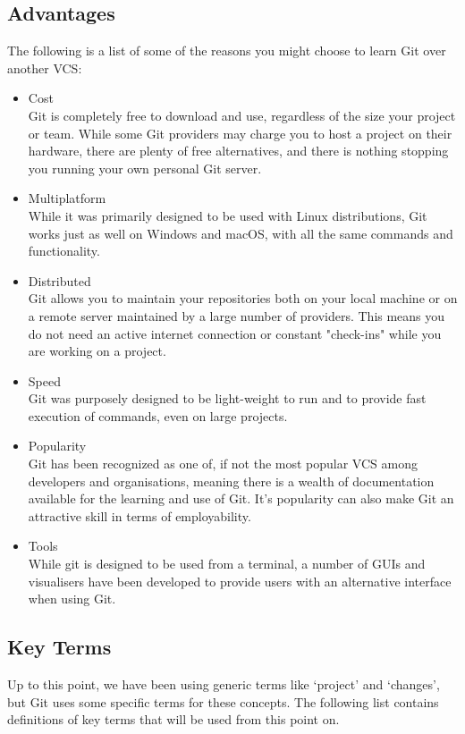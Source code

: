 \documentclass[11pt, a4paper, titlepage]{article}
\begin{document}
\subsection{Advantages}
The following is a list of some of the reasons you might choose to learn Git
over another VCS:
\begin{itemize} 
\item Cost \\
Git is completely free to download and use, regardless of the size your
project or team.  
While some Git providers may charge you to host a project on
their hardware, there are plenty of free alternatives, and there is nothing
stopping you running your own personal Git server.  
\item Multiplatform \\ 
While it was primarily designed to be used with Linux distributions, Git works
just as well on Windows and macOS, with all the same commands and functionality.
\item Distributed \\ 
Git allows you to maintain your repositories both on your local machine or on
a remote server maintained by a large number of providers. 
This means you do not need an active internet connection or constant
"check-ins" while you are working on a project.
\item Speed \\
Git was purposely designed to be light-weight to run and to provide fast
execution of commands, even on large projects.
\item Popularity \\ 
Git has been recognized as one of, if not the most popular VCS among
developers and organisations, meaning there is a wealth of documentation
available for the learning and use of Git. 
It's popularity can also make Git an attractive skill in terms of
employability.
\item Tools \\
While git is designed to be used from a terminal, a number of GUIs and
visualisers have been developed to provide users with an alternative interface
when using Git.
\end{itemize}

\subsection{Key Terms} 
Up to this point, we have been using generic terms like `project' and
`changes', but Git uses some specific terms for these concepts.
The following list contains definitions of key terms that will be used from
this point on.
\end{document}

